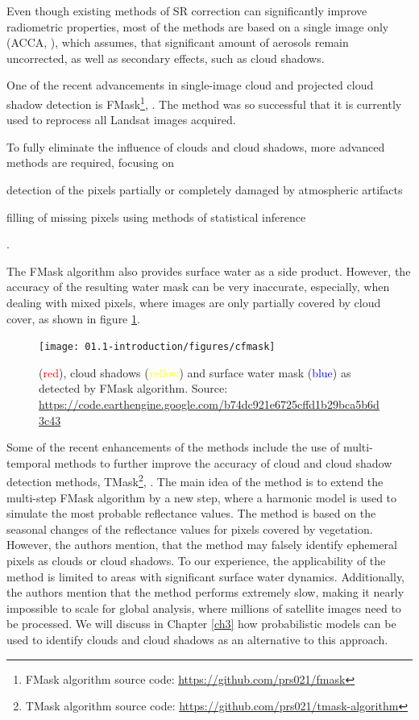 Even though existing methods of SR correction can significantly improve radiometric properties, most of the methods are based on a single image only (ACCA, \citep{irish2006characterization}), which assumes, that significant amount of aerosols remain uncorrected, as well as secondary effects, such as cloud shadows. 

One of the recent advancements in single-image cloud and projected cloud shadow detection is FMask\footnote{FMask algorithm source code: \url{https://github.com/prs021/fmask}}, \citep{zhu2012object, zhu2015improvement}. The method was so successful that it is currently used to reprocess all Landsat images acquired. 

To fully eliminate the influence of clouds and cloud shadows, more advanced methods are required, focusing on \begin{enumerate*}[label=(\emph{\alph*})]
	\item detection of the pixels partially or completely damaged by atmospheric artifacts
	\item filling of missing pixels using methods of statistical inference
\end{enumerate*}. 

The FMask algorithm also provides surface water as a side product. However, the accuracy of the resulting water mask can be very inaccurate, especially, when dealing with mixed pixels, where images are only partially covered by cloud cover, as shown in figure \ref{fig:cfmask}.

\begin{figure}[H]
	\texttt{[image: 01.1-introduction/figures/cfmask]}
	\caption{(\textcolor{red}{red}), cloud shadows (\textcolor{yellow}{yellow}) and surface water mask (\textcolor{blue}{blue}) as detected by FMask algorithm. Source: \url{https://code.earthengine.google.com/b74dc921e6725cffd1b29bca5b6d3c43}}
	\label{fig:cfmask}
\end{figure}

Some of the recent enhancements of the methods include the use of multi-temporal methods to further improve the accuracy of cloud and cloud shadow detection methods, TMask\footnote{TMask algorithm source code: \url{https://github.com/prs021/tmask-algorithm}}, \citep{zhu2014automated}. The main idea of the method is to extend the multi-step FMask algorithm by a new step, where a harmonic model is used to simulate the most probable reflectance values. The method is based on the seasonal changes of the reflectance values for pixels covered by vegetation. However, the authors mention, that the method may falsely identify ephemeral pixels as clouds or cloud shadows. To our experience, the applicability of the method is limited to areas with significant surface water dynamics. Additionally, the authors mention that the method performs extremely slow, making it nearly impossible to scale for global analysis, where millions of satellite images need to be processed. We will discuss in Chapter \ref{ch3} how probabilistic models can be used to identify clouds and cloud shadows as an alternative to this approach. 

